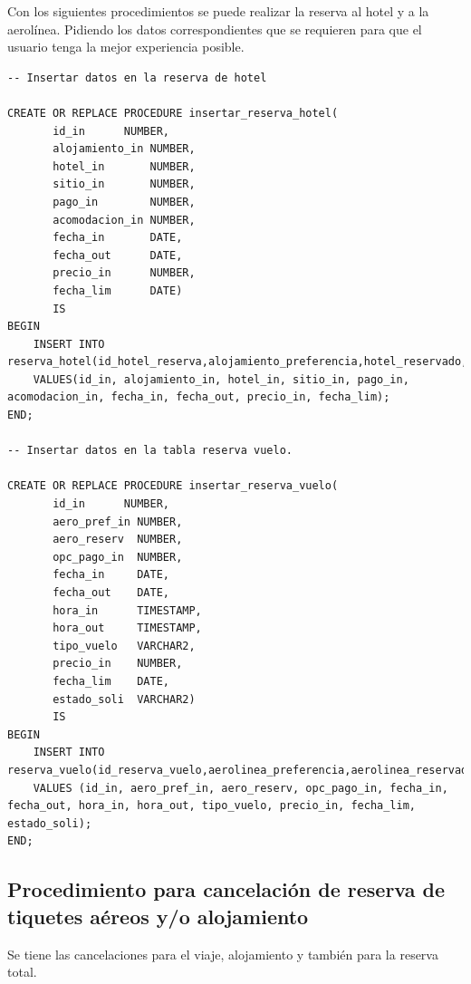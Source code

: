 \documentclass{article}
\begin{document}
Con los siguientes procedimientos se puede realizar la reserva al hotel y a la aerolínea. Pidiendo los datos correspondientes  que se requieren para que el usuario tenga la mejor experiencia posible.

\begin{lstlisting}
-- Insertar datos en la reserva de hotel

CREATE OR REPLACE PROCEDURE insertar_reserva_hotel(
       id_in	  NUMBER,
       alojamiento_in NUMBER,
       hotel_in	      NUMBER,
       sitio_in	      NUMBER,
       pago_in	      NUMBER,
       acomodacion_in NUMBER,
       fecha_in	      DATE,
       fecha_out      DATE,
       precio_in      NUMBER,
       fecha_lim      DATE)
       IS
BEGIN
	INSERT INTO reserva_hotel(id_hotel_reserva,alojamiento_preferencia,hotel_reservado,sitio_preferencia,opcion_pago,tipo_acomodacion,fecha_ingreso,fecha_salida,precio_reserva,fecha_limite_pago)
	VALUES(id_in, alojamiento_in, hotel_in, sitio_in, pago_in, acomodacion_in, fecha_in, fecha_out, precio_in, fecha_lim);
END;

-- Insertar datos en la tabla reserva vuelo.

CREATE OR REPLACE PROCEDURE insertar_reserva_vuelo(
       id_in	  NUMBER,
       aero_pref_in NUMBER,
       aero_reserv  NUMBER,
       opc_pago_in  NUMBER,
       fecha_in	    DATE,
       fecha_out    DATE,
       hora_in	    TIMESTAMP,
       hora_out	    TIMESTAMP,
       tipo_vuelo   VARCHAR2,
       precio_in    NUMBER,
       fecha_lim    DATE,
       estado_soli  VARCHAR2)
       IS
BEGIN
	INSERT INTO reserva_vuelo(id_reserva_vuelo,aerolinea_preferencia,aerolinea_reservada,opcion_pago,fecha_salida,fecha_regreso,hora_salida,hora_regreso,tipo_vuelo,precio_vuelo,fecha_limite_pago,estado_solicitud_vuelo)
	VALUES (id_in, aero_pref_in, aero_reserv, opc_pago_in, fecha_in, fecha_out, hora_in, hora_out, tipo_vuelo, precio_in, fecha_lim, estado_soli);
END;
\end{lstlisting}


\subsection{Procedimiento para cancelación de reserva de tiquetes aéreos y/o alojamiento}
Se tiene las cancelaciones para el viaje, alojamiento y también para la reserva total.
\end{document}
